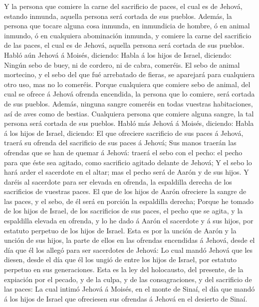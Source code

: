  Y la persona que comiere la carne del sacrificio de paces,
el cual es de Jehová, estando inmunda, aquella persona será cortada de
sus pueblos.  Además, la persona que tocare alguna cosa
inmunda, en inmundicia de hombre, ó en animal inmundo, ó en cualquiera
abominación inmunda, y comiere la carne del sacrificio de las paces, el
cual es de Jehová, aquella persona será cortada de sus pueblos.
 Habló aún Jehová á Moisés, diciendo:  Habla á
los hijos de Israel, diciendo: Ningún sebo de buey, ni de cordero, ni de
cabra, comeréis.  El sebo de animal mortecino, y el sebo
del que fué arrebatado de fieras, se aparejará para cualquiera otro uso,
mas no lo comeréis.  Porque cualquiera que comiere sebo de
animal, del cual se ofrece á Jehová ofrenda encendida, la persona que lo
comiere, será cortada de sus pueblos.  Además, ninguna
sangre comeréis en todas vuestras habitaciones, así de aves como de
bestias.  Cualquiera persona que comiere alguna sangre, la
tal persona será cortada de sus pueblos.  Habló más Jehová
á Moisés, diciendo:  Habla á los hijos de Israel, diciendo:
El que ofreciere sacrificio de sus paces á Jehová, traerá su ofrenda del
sacrificio de sus paces á Jehová;  Sus manos traerán las
ofrendas que se han de quemar á Jehová: traerá el sebo con el pecho: el
pecho para que éste sea agitado, como sacrificio agitado delante de
Jehová;  Y el sebo lo hará arder el sacerdote en el altar;
mas el pecho será de Aarón y de sus hijos.  Y daréis al
sacerdote para ser elevada en ofrenda, la espaldilla derecha de los
sacrificios de vuestras paces.  El que de los hijos de
Aarón ofreciere la sangre de las paces, y el sebo, de él será en porción
la espaldilla derecha;  Porque he tomado de los hijos de
Israel, de los sacrificios de sus paces, el pecho que se agita, y la
espaldilla elevada en ofrenda, y lo he dado á Aarón el sacerdote y á sus
hijos, por estatuto perpetuo de los hijos de Israel.  Esta
es por la unción de Aarón y la unción de sus hijos, la parte de ellos en
las ofrendas encendidas á Jehová, desde el día que él los allegó para
ser sacerdotes de Jehová:  Lo cual mandó Jehová que les
diesen, desde el día que él los ungió de entre los hijos de Israel, por
estatuto perpetuo en sus generaciones.  Esta es la ley del
holocausto, del presente, de la expiación por el pecado, y de la culpa,
y de las consagraciones, y del sacrificio de las paces:  La
cual intimó Jehová á Moisés, en el monte de Sinaí, el día que mandó á
los hijos de Israel que ofreciesen sus ofrendas á Jehová en el desierto
de Sinaí.

